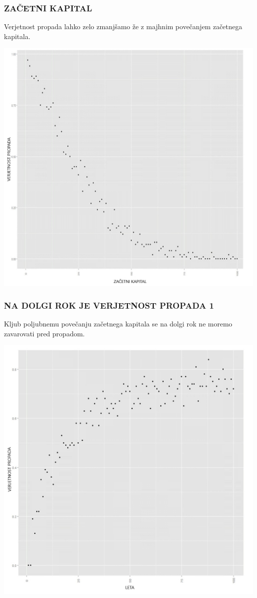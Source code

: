 \documentclass{beamer}
\begin{document}
\begin{frame}
	\frametitle{ZAČETNI KAPITAL}
	Verjetnost propada lahko zelo zmanjšamo že z majhnim povečanjem začetnega kapitala.
	\begin{center}
		\includegraphics[scale=0.23]{graf1.jpg}  
	\end{center}
\end{frame}

\begin{frame}
	\frametitle{NA DOLGI ROK JE VERJETNOST PROPADA 1}
	Kljub poljubnemu povečanju začetnega kapitala se na dolgi rok ne moremo zavarovati pred propadom.
	\begin{center}
		\includegraphics[scale=0.23]{graf3.jpg}  
	\end{center}
\end{frame}
\end{document}
